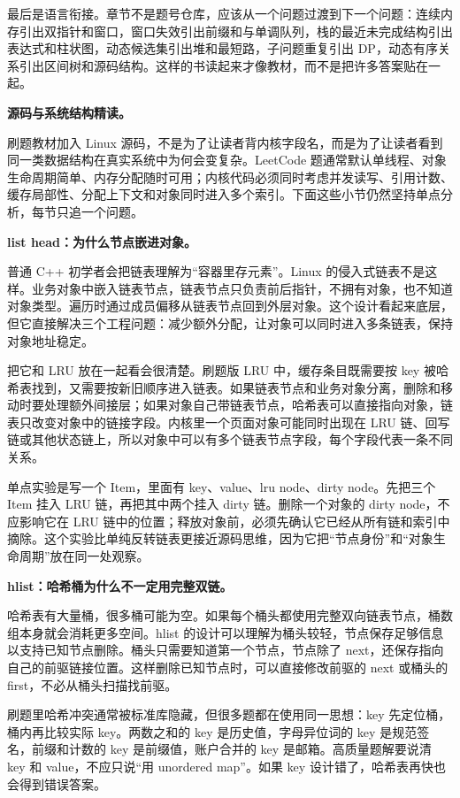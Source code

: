 最后是语言衔接。章节不是题号仓库，应该从一个问题过渡到下一个问题：连续内存引出双指针和窗口，窗口失效引出前缀和与单调队列，栈的最近未完成结构引出表达式和柱状图，动态候选集引出堆和最短路，子问题重复引出 DP，动态有序关系引出区间树和源码结构。这样的书读起来才像教材，而不是把许多答案贴在一起。

\noindent\textbf{源码与系统结构精读。}

刷题教材加入 Linux 源码，不是为了让读者背内核字段名，而是为了让读者看到同一类数据结构在真实系统中为何会变复杂。LeetCode 题通常默认单线程、对象生命周期简单、内存分配随时可用；内核代码必须同时考虑并发读写、引用计数、缓存局部性、分配上下文和对象同时进入多个索引。下面这些小节仍然坚持单点分析，每节只追一个问题。

\noindent\textbf{list head：为什么节点嵌进对象。}

普通 C++ 初学者会把链表理解为“容器里存元素”。Linux 的侵入式链表不是这样。业务对象中嵌入链表节点，链表节点只负责前后指针，不拥有对象，也不知道对象类型。遍历时通过成员偏移从链表节点回到外层对象。这个设计看起来底层，但它直接解决三个工程问题：减少额外分配，让对象可以同时进入多条链表，保持对象地址稳定。

把它和 LRU 放在一起看会很清楚。刷题版 LRU 中，缓存条目既需要按 key 被哈希表找到，又需要按新旧顺序进入链表。如果链表节点和业务对象分离，删除和移动时要处理额外间接层；如果对象自己带链表节点，哈希表可以直接指向对象，链表只改变对象中的链接字段。内核里一个页面对象可能同时出现在 LRU 链、回写链或其他状态链上，所以对象中可以有多个链表节点字段，每个字段代表一条不同关系。

单点实验是写一个 Item，里面有 key、value、lru node、dirty node。先把三个 Item 挂入 LRU 链，再把其中两个挂入 dirty 链。删除一个对象的 dirty node，不应影响它在 LRU 链中的位置；释放对象前，必须先确认它已经从所有链和索引中摘除。这个实验比单纯反转链表更接近源码思维，因为它把“节点身份”和“对象生命周期”放在同一处观察。

\noindent\textbf{hlist：哈希桶为什么不一定用完整双链。}

哈希表有大量桶，很多桶可能为空。如果每个桶头都使用完整双向链表节点，桶数组本身就会消耗更多空间。hlist 的设计可以理解为桶头较轻，节点保存足够信息以支持已知节点删除。桶头只需要知道第一个节点，节点除了 next，还保存指向自己的前驱链接位置。这样删除已知节点时，可以直接修改前驱的 next 或桶头的 first，不必从桶头扫描找前驱。

刷题里哈希冲突通常被标准库隐藏，但很多题都在使用同一思想：key 先定位桶，桶内再比较实际 key。两数之和的 key 是历史值，字母异位词的 key 是规范签名，前缀和计数的 key 是前缀值，账户合并的 key 是邮箱。高质量题解要说清 key 和 value，不应只说“用 unordered map”。如果 key 设计错了，哈希表再快也会得到错误答案。


